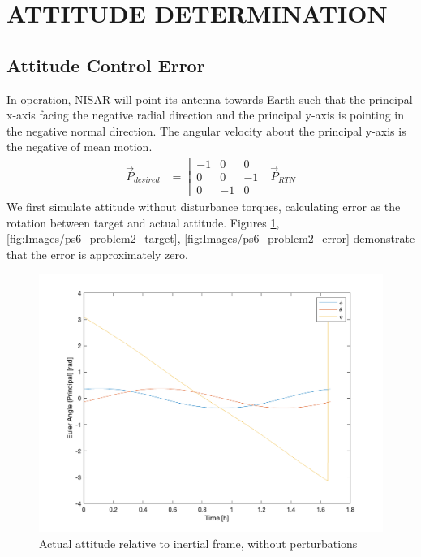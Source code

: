 \section{\Large ATTITUDE DETERMINATION}
\subsection{Attitude Control Error}
In operation, NISAR will point its antenna towards Earth such that the principal x-axis facing the negative radial direction and the principal y-axis is pointing in the negative normal direction. The angular velocity about the principal y-axis is the negative of mean motion.
\begin{align*}
    \Vec{P}_{desired} &= 
    \begin{bmatrix}
    -1 & 0 & 0 \\
    0 & 0 & -1 \\
    0 & -1 & 0
    \end{bmatrix}
    \Vec{P}_{RTN}
\end{align*}
We first simulate attitude without disturbance torques, calculating error as the rotation between target and actual attitude. Figures \ref{fig:Images/ps6_problem2_principal}, \ref{fig:Images/ps6_problem2_target}, \ref{fig:Images/ps6_problem2_error} demonstrate that the error is approximately zero.

\begin{figure}[H]
\centering
\includegraphics[scale=0.6]{Images/ps6_problem2_principal.png}
\caption{Actual attitude relative to inertial frame, without perturbations}
\label{fig:Images/ps6_problem2_principal}
\end{figure}

